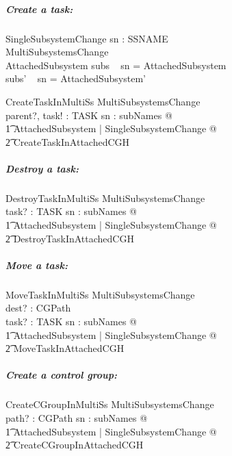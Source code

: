 \documentclass[a4paper,twoside,12pt]{article}
\begin{document}
\subparagraph{Create a task:}

\begin{schema}{SingleSubsystemChange}
sn : SSNAME \\
MultiSubsystemsChange \\
\Delta AttachedSubsystem
\where
subs ~ sn = \theta AttachedSubsystem \\
subs' ~ sn = \theta AttachedSubsystem'
\end{schema}

\begin{schema}{CreateTaskInMultiSs}
MultiSubsystemsChange \\
parent?, task! : TASK
\where
\forall sn : subNames @ \\
\t1 \exists \Delta AttachedSubsystem | SingleSubsystemChange @ \\
    \t2 CreateTaskInAttachedCGH
\end{schema}


\subparagraph{Destroy a task:}

\begin{schema}{DestroyTaskInMultiSs}
MultiSubsystemsChange \\
task? : TASK
\where
\forall sn : subNames @ \\
\t1 \exists \Delta AttachedSubsystem | SingleSubsystemChange @ \\
    \t2 DestroyTaskInAttachedCGH
\end{schema}


\subparagraph{Move a task:}

\begin{schema}{MoveTaskInMultiSs}
MultiSubsystemsChange \\
dest? : CGPath \\
task? : TASK
\where
\forall sn : subNames @ \\
\t1 \exists \Delta AttachedSubsystem | SingleSubsystemChange @ \\
    \t2 MoveTaskInAttachedCGH
\end{schema}

\subparagraph{Create a control group:}

\begin{schema}{CreateCGroupInMultiSs}
MultiSubsystemsChange \\
path? : CGPath
\where
\forall sn : subNames @ \\
\t1 \exists \Delta AttachedSubsystem | SingleSubsystemChange @ \\
    \t2 CreateCGroupInAttachedCGH
\end{schema}
\end{document}
